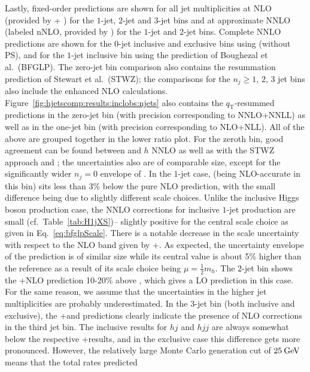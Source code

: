 Lastly, fixed-order predictions are shown for all jet multiplicities
at NLO (provided by \GoSam{}+ \Sherpa) for the $1$-jet, $2$-jet and
$3$-jet bins and at approximate NNLO (labeled nNLO, provided by \Loopsim) 
for the $1$-jet and $2$-jet bins.
Complete NNLO predictions are shown for the $0$-jet inclusive and
exclusive bins using \Sherpa (without PS), and for the $1$-jet inclusive
bin using the prediction of Boughezal et al.~(BFGLP).
The zero-jet bin comparison
also contains the resummation prediction of Stewart et
al.~(STWZ); the comparisons for the $n_j\ge 1$, $2$, $3$ jet bins also
include the \Minlo enhanced NLO calculations.
Figure~\ref{fig:hjetscomp:results:inclobs:njets} also
contains the \Resbos $q_\text{T}$-resummed predictions in the zero-jet bin
(with precision corresponding to NNLO+NNLL) as well as in the
one-jet bin (with precision corresponding to NLO+NLL). All of the
above are grouped together in the lower ratio plot.
For the zeroth bin, good agreement can be found between \Powheg and
\Sherpa $h$ NNLO as well as with the STWZ approach and \Resbos; the
uncertainties also are of comparable size, except for the
significantly wider $n_j=0$ envelope of \Powheg.
In the $1$-jet case, \Powheg (being NLO-accurate in this bin)
sits less than 3\% below the pure NLO prediction, with the small difference
being due to slightly different scale choices. Unlike the inclusive Higgs
boson production case, the NNLO corrections for inclusive $1$-jet
production are small (cf.~Table~\ref{tab:H1jXS})-- slightly positive
for the central scale choice as given in Eq.~\eqref{eq:bfglpScale}.
There is a notable decrease in the scale uncertainty with respect to
the NLO band given by \GoSam{}+\Sherpa. As expected, the uncertainty
envelope of the \Resbos prediction is of similar size while its
central value is about 5\% higher than the reference as a result of
its scale choice being $\mu=\tfrac{1}{2}m_h$.
The $2$-jet bin shows the \GoSam{}+\Sherpa NLO prediction 10-20\%
above \Powheg, which gives a LO prediction in this case. For the same
reason, we assume that the \Powheg uncertainties in the higher jet
multiplicities are probably underestimated.
In the $3$-jet bin (both inclusive and exclusive), the
\GoSam{}+\Sherpa and \Sherpa \MEPSatNLO predictions clearly indicate the
presence of  NLO corrections in the third jet bin. The \Loopsim
inclusive results for $hj$ and $hjj$ are always somewhat below the
respective \GoSam{}+\Sherpa results, and in the exclusive case this
difference gets more pronounced. However, the relatively large Monte
Carlo generation cut of $25\text{\:GeV}$ means that the total rates predicted
